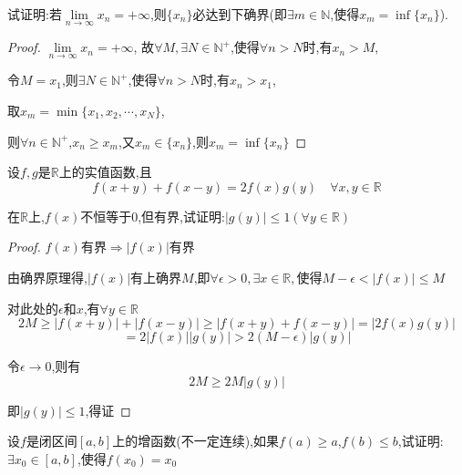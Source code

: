 \begin{exercise}
    试证明:若$\underset{n \to \infty}{\lim}x_n=+\infty$,则$\{x_n\}$必达到下确界(即$\exists m \in \mathbb{N}$,使得$x_m=\inf \{x_n\}$). 
\end{exercise} 

\begin{proof}
    $\underset{n \to \infty}{\lim}x_n=+\infty$,
    故$\forall M,\exists N \in \mathbb{N^+}$,使得$\forall n>N$时,有$x_n>M$,

    令$M=x_1$,则$\exists N \in \mathbb{N^+}$,使得$\forall n>N$时,有$x_n>x_1$,

    取$x_m=\min \{x_1,x_2,\cdots,x_N\}$,

    则$\forall n \in \mathbb{N^+}$,$x_n\ge x_m$,又$x_m \in \{x_n\}$,则$x_m=\inf \{x_n\}$
\end{proof}

\begin{exercise}
    设$f,g$是$\mathbb{R}$上的实值函数,且
    \begin{equation*}
        f(x+y)+f(x-y)=2f(x)g(y)\quad \forall x,y\in \mathbb{R}
    \end{equation*}

    在$\mathbb{R}$上,$f(x)$不恒等于0,但有界,试证明:$|g(y)|\le 1 (\forall y \in \mathbb{R})$
\end{exercise}

\begin{proof}
    $f(x)$有界$\Longrightarrow |f(x)|$有界 

    由确界原理得,$|f(x)|$有上确界$M$,即$\forall \epsilon >0,\exists x\in \mathbb{R},$使得$M-\epsilon<|f(x)|\le M$

    对此处的$\epsilon$和$x$,有$\forall y\in \mathbb{R}$
    \begin{equation*}
        2M\ge |f(x+y)|+|f(x-y)|\ge |f(x+y)+f(x-y)|=|2f(x)g(y)|
    \end{equation*}
    \begin{equation*}
        =2|f(x)||g(y)|>2(M-\epsilon)|g(y)|
    \end{equation*}

    令$\epsilon \to 0$,则有
    \begin{equation*}
        2M \ge 2M |g(y)|
    \end{equation*}

    即$|g(y)|\le 1$,得证
\end{proof}

\begin{exercise}
    设$f$是闭区间$[a,b]$上的增函数(不一定连续),如果$f(a)\ge a$,$f(b)\le b$,试证明:$\exists x_0 \in [a,b]$,使得$f(x_0)=x_0$
\end{exercise}

